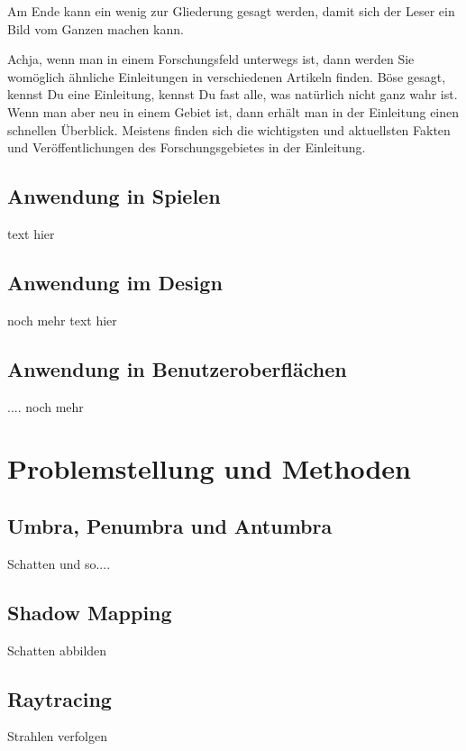 \documentclass[10pt,twocolumn]{scrartcl}
\begin{document}
Am Ende kann ein wenig zur Gliederung gesagt werden,
damit sich der Leser ein Bild vom Ganzen machen kann.

Achja, wenn man in einem Forschungsfeld unterwegs ist, dann
werden Sie womöglich ähnliche Einleitungen in verschiedenen
Artikeln finden. Böse gesagt, kennst Du eine 
Einleitung, kennst Du fast alle, was natürlich nicht
ganz wahr ist. Wenn man aber neu in einem Gebiet
ist, dann erhält man in der Einleitung einen schnellen Überblick.
Meistens finden sich die wichtigsten und aktuellsten 
Fakten und Veröffentlichungen des Forschungsgebietes in der Einleitung.

\subsection{Anwendung in Spielen}

text hier 

\subsection{Anwendung im Design}

noch mehr text hier

\subsection{Anwendung in Benutzeroberflächen}

.... noch mehr

\section{Problemstellung und Methoden}

\subsection{Umbra, Penumbra und Antumbra}

Schatten und so....

\subsection{Shadow Mapping}

Schatten abbilden

\subsection{Raytracing}

Strahlen verfolgen
\end{document}
